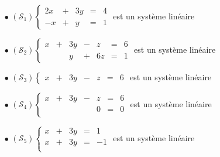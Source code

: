 \documentclass[a4paper, 11pt]{article}
\begin{document}
\begin{exemples} 
\begin{itemize}
\item[$\bullet$] $(\mathcal{S}_1)\left\lbrace\begin{array}{rcrcr}
2x & + & 3y & = & 4\\
-x & + &  y  & = &1
\end{array}\right.$ est un syst\`{e}me lin\'eaire \dotfill \vsec
\item[$\bullet$] $(\mathcal{S}_2)\left\lbrace\begin{array}{rcrcrcr}
x&+&3y&-&z&=&6\\
 & &y&+&6z&=&1
\end{array}\right.$ est un syst\`{e}me lin\'eaire \dotfill
\item[$\bullet$] $(\mathcal{S}_3)\left\lbrace\begin{array}{rcrcrcr}
x&+&3y&-&z&=&6
\end{array}\right.$ est un syst\`{e}me lin\'eaire \dotfill
\item[$\bullet$] $(\mathcal{S}_4)\left\lbrace\begin{array}{rcrcrcr}
x&+&3y&-&z&=&6\\
  & &&&0&=&0\\
\end{array}\right.$ est un syst\`{e}me lin\'eaire \dotfill
\item[$\bullet$] $(\mathcal{S}_5)\left\lbrace\begin{array}{rcrcr}
x&+&3y&=&1\\
x&+&3y&=&-1\\
\end{array}\right.$ est un syst\`{e}me lin\'eaire \dotfill
\end{itemize}
\end{exemples}

\vspace{0.4cm}

\end{document}
